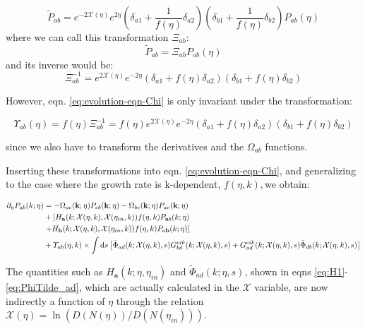 \begin{equation}
\tilde{P}_{ab}=e^{-2\mathcal{X}(\eta)}e^{2\eta}(\delta_{a1}+\frac{1}{f(\eta)}\delta_{a2})(\delta_{b1}+\frac{1}{f(\eta)}\delta_{b2})P_{ab}(\eta)\label{eq:PS-transformation}
\end{equation}
where we can call this transformation $\varXi_{ab}$: 
\[
\tilde{P}_{ab}=\varXi_{ab}P_{ab}(\eta)
\]
and its inverse would be: 
\begin{equation}
\varXi_{ab}^{-1}=e^{2\mathcal{X}(\eta)}e^{-2\eta}(\delta_{a1}+f(\eta)\delta_{a2})(\delta_{b1}+f(\eta)\delta_{b2})
\end{equation}


However, eqn. \ref{eq:evolution-eqn-Chi} is only invariant under
the transformation:

\begin{equation}
\varUpsilon_{ab}(\eta)=f(\eta)\varXi_{ab}^{-1}=f(\eta)e^{2\mathcal{X}(\eta)}e^{-2\eta}(\delta_{a1}+f(\eta)\delta_{a2})(\delta_{b1}+f(\eta)\delta_{b2})
\end{equation}


since we also have to transform the derivatives and the $\Omega_{ab}$
functions. 

Inserting these transformations into eqn. \ref{eq:evolution-eqn-Chi},
and generalizing to the case where the growth rate is k-dependent,
$f(\eta,k),$we obtain:

\begin{align}
\partial_{\mathcal{\eta}}P_{ab}(k;\eta) & =-\Omega_{ac}(\mathbf{k};\eta) P_{cb}(\mathbf{k};\eta)-\Omega_{bc}(\mathbf{k};\eta) P_{ac}(\mathbf{k};\eta)\label{eq:evolution-eqn-Chi-eta}\\
 & +\left[H_{\mathbf{a}}(k;\mathcal{X}(\eta,k),\mathcal{X}(\eta_{in},k))f(\eta,k)P_{\mathbf{a}b}(k;\eta)\right.\nonumber \\
 & \left.+H_{\mathbf{b}}(k;\mathcal{X}(\eta,k),\mathcal{X}(\eta_{in},k))f(\eta,k)P_{a\mathbf{b}}(k;\eta)\right]\nonumber \\
 & +\varUpsilon_{ab}(\eta,k)\times\int\mathrm{d} s\left[\tilde{\Phi}_{ad}(k;\mathcal{X}(\eta,k),s)G_{bd}^{eik}(k;\mathcal{X}(\eta,k),s)+G_{ad}^{eik}(k;\mathcal{X}(\eta,k),s)\tilde{\Phi}_{db}(k;\mathcal{X}(\eta,k),s)\right]\nonumber 
\end{align}


The quantities such as $H_{\mathbf{a}}(k;\eta,\eta_{in})$ and $\tilde{\Phi}_{ad}(k;\mathcal{\eta},s)$,
shown in eqns \ref{eq:H1}-\ref{eq:PhiTilde_ad}, which are actually
calculated in the $\mathcal{X}$ variable, are now indirectly a function
of $\eta$ through the relation $\mathcal{X}(\eta)=\ln(D(N(\eta))/D(N(\eta_{in})))$.

